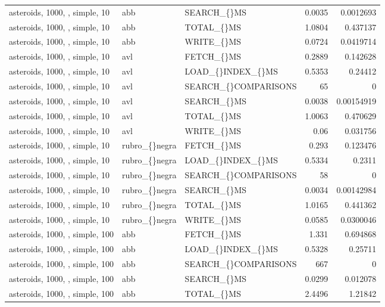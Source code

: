 \begin{longtable}{p{4cm}p{1.4cm}p{2.6cm}rr}
asteroids, 1000, , simple, 10 & abb & SEARCH\_\allowbreak\{\}MS & 0.0035 & 0.0012693\\
asteroids, 1000, , simple, 10 & abb & TOTAL\_\allowbreak\{\}MS & 1.0804 & 0.437137\\
asteroids, 1000, , simple, 10 & abb & WRITE\_\allowbreak\{\}MS & 0.0724 & 0.0419714\\
asteroids, 1000, , simple, 10 & avl & FETCH\_\allowbreak\{\}MS & 0.2889 & 0.142628\\
asteroids, 1000, , simple, 10 & avl & LOAD\_\allowbreak\{\}INDEX\_\allowbreak\{\}MS & 0.5353 & 0.24412\\
asteroids, 1000, , simple, 10 & avl & SEARCH\_\allowbreak\{\}COMPARISONS & 65 & 0\\
asteroids, 1000, , simple, 10 & avl & SEARCH\_\allowbreak\{\}MS & 0.0038 & 0.00154919\\
asteroids, 1000, , simple, 10 & avl & TOTAL\_\allowbreak\{\}MS & 1.0063 & 0.470629\\
asteroids, 1000, , simple, 10 & avl & WRITE\_\allowbreak\{\}MS & 0.06 & 0.031756\\
asteroids, 1000, , simple, 10 & rubro\_\allowbreak\{\}negra & FETCH\_\allowbreak\{\}MS & 0.293 & 0.123476\\
asteroids, 1000, , simple, 10 & rubro\_\allowbreak\{\}negra & LOAD\_\allowbreak\{\}INDEX\_\allowbreak\{\}MS & 0.5334 & 0.2311\\
asteroids, 1000, , simple, 10 & rubro\_\allowbreak\{\}negra & SEARCH\_\allowbreak\{\}COMPARISONS & 58 & 0\\
asteroids, 1000, , simple, 10 & rubro\_\allowbreak\{\}negra & SEARCH\_\allowbreak\{\}MS & 0.0034 & 0.00142984\\
asteroids, 1000, , simple, 10 & rubro\_\allowbreak\{\}negra & TOTAL\_\allowbreak\{\}MS & 1.0165 & 0.441362\\
asteroids, 1000, , simple, 10 & rubro\_\allowbreak\{\}negra & WRITE\_\allowbreak\{\}MS & 0.0585 & 0.0300046\\
asteroids, 1000, , simple, 100 & abb & FETCH\_\allowbreak\{\}MS & 1.331 & 0.694868\\
asteroids, 1000, , simple, 100 & abb & LOAD\_\allowbreak\{\}INDEX\_\allowbreak\{\}MS & 0.5328 & 0.25711\\
asteroids, 1000, , simple, 100 & abb & SEARCH\_\allowbreak\{\}COMPARISONS & 667 & 0\\
asteroids, 1000, , simple, 100 & abb & SEARCH\_\allowbreak\{\}MS & 0.0299 & 0.012078\\
asteroids, 1000, , simple, 100 & abb & TOTAL\_\allowbreak\{\}MS & 2.4496 & 1.21842\\

\end{longtable}
